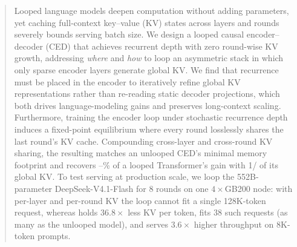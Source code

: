 \begin{abstract}
Looped language models deepen computation without adding parameters, yet caching full-context key--value (KV) states across layers and rounds severely bounds serving batch size. We design a looped causal encoder--decoder (CED) that achieves recurrent depth with zero round-wise KV growth, addressing \textit{where} and \textit{how} to loop an asymmetric stack in which only sparse encoder layers generate global KV. We find that recurrence must be placed in the encoder to iteratively refine global KV representations rather than re-reading static decoder projections, which both drives language-modeling gains and preserves long-context scaling. Furthermore, training the encoder loop under stochastic recurrence depth induces a fixed-point equilibrium where every round losslessly shares the last round's KV cache. Compounding cross-layer and cross-round KV sharing, the resulting \textbf{\ourmethod} matches an unlooped CED's minimal memory footprint and recovers --\% of a looped Transformer's gain with 1/ of its global KV. To test serving at production scale, we loop the 552B-parameter DeepSeek-V4.1-Flash for 8 rounds on one $4\times$GB200 node: with per-layer and per-round KV the loop cannot fit a single 128K-token request, whereas \ourmethod holds $36.8\times$ less KV per token, fits 38 such requests (as many as the unlooped model), and serves $3.6\times$ higher throughput on 8K-token prompts.
\end{abstract}